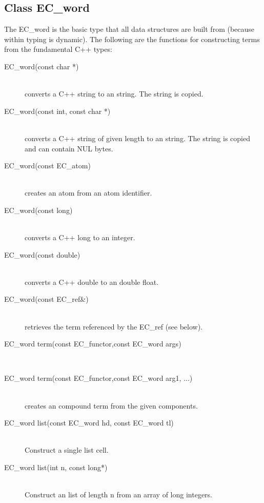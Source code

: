 \subsection{Class EC_word}
The EC_word is the basic type that all {\eclipse} data structures are
built from (because within {\eclipse} typing is dynamic).
The following are the functions for constructing {\eclipse} terms from
the fundamental C++ types:
\begin{description}
\item[EC_word(const char *)]\ \\
	converts a C++ string to an {\eclipse} string. The string is copied.

\item[EC_word(const int, const char *)]\ \\
	converts a C++ string of given length to an {\eclipse} string.
	The string is copied and can contain NUL bytes.

\item[EC_word(const EC_atom)]\ \\
	creates an {\eclipse} atom from an atom identifier.

\item[EC_word(const long)]\ \\
	converts a C++ long to an {\eclipse} integer.

\item[EC_word(const double)]\ \\
	converts a C++ double to an {\eclipse} double float.

\item[EC_word(const EC_ref\&)]\ \\
	retrieves the {\eclipse} term referenced by the EC_ref (see below).

\item[EC_word term(const EC_functor,const EC_word args\nil)]\ \\
\item[EC_word term(const EC_functor,const EC_word arg1, ...)]\ \\
	creates an {\eclipse} compound term from the given components.

\item[EC_word list(const EC_word hd, const EC_word tl)]\ \\
	Construct a single {\eclipse} list cell.

\item[EC_word list(int n, const long*)]\ \\
	Construct an {\eclipse} list of length n from an array of long integers.


\end{description}
